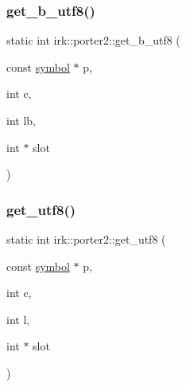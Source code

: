\mbox{\label{namespaceirk_1_1porter2_a7cba9ed5de039680320ccb6c08077787}} 
\subsubsection{\texorpdfstring{get\+\_\+b\+\_\+utf8()}{get\_b\_utf8()}}
{\footnotesize\ttfamily static int irk\+::porter2\+::get\+\_\+b\+\_\+utf8 (\begin{DoxyParamCaption}\item[{const \mbox{\hyperlink{namespaceirk_1_1porter2_afd04c4eb58a1dabcf8f3ab2d7e9f9ed5}{symbol}} $\ast$}]{p,  }\item[{int}]{c,  }\item[{int}]{lb,  }\item[{int $\ast$}]{slot }\end{DoxyParamCaption})\hspace{0.3cm}{\ttfamily [static]}}

\mbox{\label{namespaceirk_1_1porter2_a2d7c3ab19addd92a4fc0c77a44e2e84e}} 
\subsubsection{\texorpdfstring{get\+\_\+utf8()}{get\_utf8()}}
{\footnotesize\ttfamily static int irk\+::porter2\+::get\+\_\+utf8 (\begin{DoxyParamCaption}\item[{const \mbox{\hyperlink{namespaceirk_1_1porter2_afd04c4eb58a1dabcf8f3ab2d7e9f9ed5}{symbol}} $\ast$}]{p,  }\item[{int}]{c,  }\item[{int}]{l,  }\item[{int $\ast$}]{slot }\end{DoxyParamCaption})\hspace{0.3cm}{\ttfamily [static]}}

\mbox{\label{namespaceirk_1_1porter2_acc700c6b29e6c125665f86074d4ab588}} 
